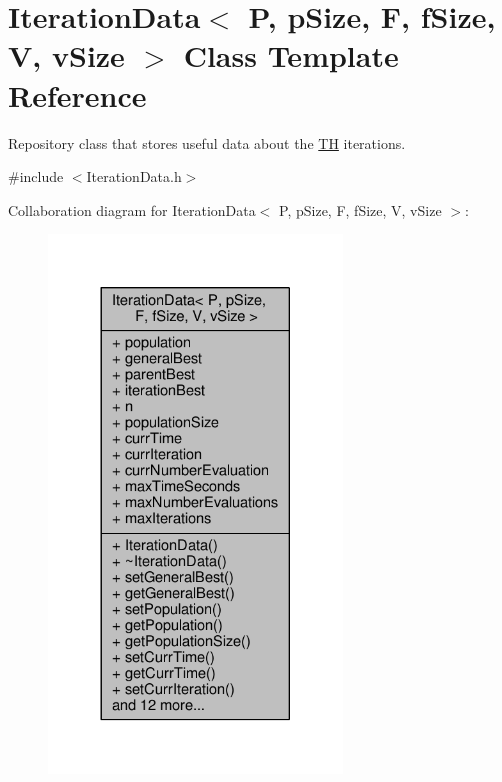 \hypertarget{structIterationData}{}\section{Iteration\+Data$<$ P, p\+Size, F, f\+Size, V, v\+Size $>$ Class Template Reference}
\label{structIterationData}


Repository class that stores useful data about the \hyperlink{classTH}{TH} iterations.  




{\ttfamily \#include $<$Iteration\+Data.\+h$>$}



Collaboration diagram for Iteration\+Data$<$ P, p\+Size, F, f\+Size, V, v\+Size $>$\+:
\nopagebreak
\begin{figure}[H]
\begin{center}
\leavevmode
\includegraphics[width=221pt]{structIterationData__coll__graph}
\end{center}
\end{figure}
